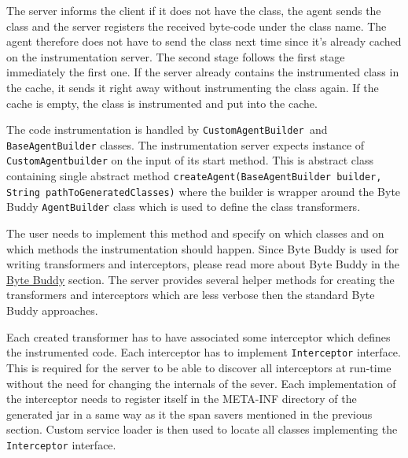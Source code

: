The server informs the client if it does not have the class, the agent sends the class and the server registers the received byte-code under the class name. The agent therefore does not have to send the class next time since it's already cached on the instrumentation server.
The second stage follows the first stage immediately the first one. If the server already contains the instrumented class in the cache, it sends it right away without instrumenting the class again. If the cache is empty, the class is instrumented and put into the cache.

The code instrumentation is handled by \texttt{CustomAgentBuilder }and \texttt{BaseAgentBuilder} classes.
The instrumentation server expects instance of \texttt{CustomAgentbuilder} on the input of its start method. This is abstract class containing single abstract method \texttt{createAgent(BaseAgentBuilder builder, String pathToGeneratedClasses)} where the builder is wrapper around the Byte Buddy \texttt{AgentBuilder} class which is used to define the class transformers.

The user needs to implement this method and specify on which classes and on which methods the instrumentation should happen. Since Byte Buddy is used for writing transformers and interceptors, please read more about Byte Buddy in the \hyperref[sec:byte_buddy]{Byte Buddy} section. The server provides several helper methods for creating the transformers and interceptors which are less verbose then the standard Byte Buddy approaches.

Each created transformer has to have associated some interceptor which defines the instrumented code. Each interceptor has to implement \texttt{Interceptor}  interface. This is required for the server to be able to discover all interceptors at run-time without the need for changing the internals of the sever. Each implementation of the interceptor needs to register itself in the META-INF directory of the generated jar in a same way as it the span savers mentioned in the previous section. Custom service loader is then used to locate all classes implementing the \texttt{Interceptor} interface.

